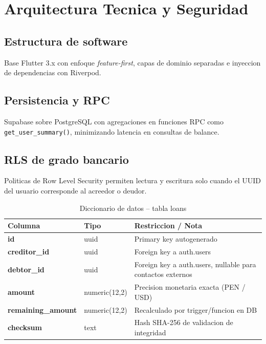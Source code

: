 \documentclass[11pt,a4paper]{article}
\begin{document}
\section{Arquitectura Tecnica y Seguridad}
\subsection{Estructura de software}
Base Flutter 3.x con enfoque \textit{feature-first}, capas de dominio separadas e inyeccion de dependencias con Riverpod.

\subsection{Persistencia y RPC}
Supabase sobre PostgreSQL con agregaciones en funciones RPC como \texttt{get\_user\_summary()}, minimizando latencia en consultas de balance.

\subsection{RLS de grado bancario}
Politicas de Row Level Security permiten lectura y escritura solo cuando el UUID del usuario corresponde al acreedor o deudor.

\begin{table}[htbp]
\centering
\caption{Diccionario de datos -- tabla loans}
\begin{tabularx}{\textwidth}{>{\bfseries}p{2.7cm}p{2.8cm}X}
\toprule
Columna & Tipo & Restriccion / Nota \\
\midrule
id & uuid & Primary key autogenerado \\
creditor\_id & uuid & Foreign key a auth.users \\
debtor\_id & uuid & Foreign key a auth.users, nullable para contactos externos \\
amount & numeric(12,2) & Precision monetaria exacta (PEN / USD) \\
remaining\_amount & numeric(12,2) & Recalculado por trigger/funcion en DB \\
checksum & text & Hash SHA-256 de validacion de integridad \\
\bottomrule
\end{tabularx}
\end{table}
\end{document}
